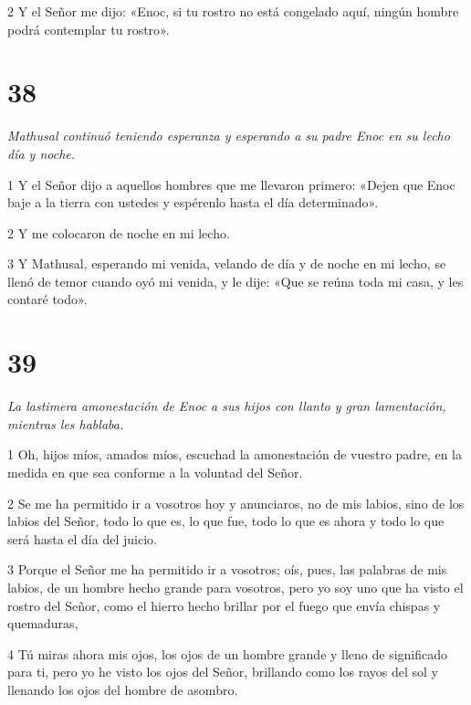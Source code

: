\par 2 Y el Señor me dijo: «Enoc, si tu rostro no está congelado aquí, ningún hombre podrá contemplar tu rostro».

\chapter{38}

\par \textit{Mathusal continuó teniendo esperanza y esperando a su padre Enoc en su lecho día y noche.}

\par 1 Y el Señor dijo a aquellos hombres que me llevaron primero: «Dejen que Enoc baje a la tierra con ustedes y espérenlo hasta el día determinado».

\par 2 Y me colocaron de noche en mi lecho.

\par 3 Y Mathusal, esperando mi venida, velando de día y de noche en mi lecho, se llenó de temor cuando oyó mi venida, y le dije: «Que se reúna toda mi casa, y les contaré todo».

\chapter{39}

\par \textit{La lastimera amonestación de Enoc a sus hijos con llanto y gran lamentación, mientras les hablaba.}

\par 1 Oh, hijos míos, amados míos, escuchad la amonestación de vuestro padre, en la medida en que sea conforme a la voluntad del Señor.

\par 2 Se me ha permitido ir a vosotros hoy y anunciaros, no de mis labios, sino de los labios del Señor, todo lo que es, lo que fue, todo lo que es ahora y todo lo que será hasta el día del juicio.

\par 3 Porque el Señor me ha permitido ir a vosotros; oís, pues, las palabras de mis labios, de un hombre hecho grande para vosotros, pero yo soy uno que ha visto el rostro del Señor, como el hierro hecho brillar por el fuego que envía chispas y quemaduras,

\par 4 Tú miras ahora mis ojos, los ojos de un hombre grande y lleno de significado para ti, pero yo he visto los ojos del Señor, brillando como los rayos del sol y llenando los ojos del hombre de asombro.

